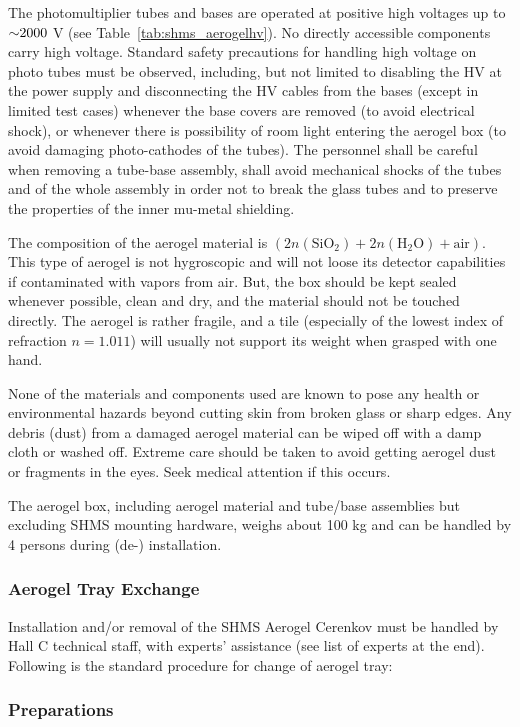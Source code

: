 {The photomultiplier tubes and bases are operated at positive high
voltages up to $\mathord{\sim} 2000$ V (see Table~\ref{tab:shms_aerogelhv}). No directly accessible
components carry high voltage. Standard safety precautions for
handling high voltage on photo tubes must be observed, including, but
not limited to disabling the HV at the power supply and disconnecting
the HV cables from the bases (except in limited test cases) whenever
the base covers are removed (to avoid electrical shock), or whenever
there is possibility of room light entering the aerogel box (to avoid
damaging photo-cathodes of the tubes). The personnel shall be careful
when removing a tube-base assembly, shall avoid mechanical shocks of
the tubes and of the whole assembly in order not to break the glass
tubes and to preserve the properties of the inner mu-metal shielding.

The composition of the aerogel material is
$(2n(\textrm{SiO}_2)+2n(\textrm{H}_2 \textrm{O})+\textrm{air})$. This type of aerogel is not hygroscopic and
will not loose its detector capabilities if contaminated with vapors
from air. But, the box should be kept sealed whenever possible, clean
and dry, and the material should not be touched directly. The aerogel
is rather fragile, and a tile (especially of the lowest index of
refraction $n=1.011$) will usually not support its weight when grasped
with one hand.

None of the materials and components used are known to pose any health
or environmental hazards beyond cutting skin from broken glass or
sharp edges. Any debris (dust) from a damaged aerogel material can be
wiped off with a damp cloth or washed off. Extreme care should be
taken to avoid getting aerogel dust or fragments in the eyes. Seek
medical attention if this occurs.

The aerogel box, including aerogel material and tube/base assemblies
but excluding SHMS mounting hardware, weighs about 100 kg and can be
handled by 4 persons during (de-) installation.

\subsubsection{Aerogel Tray Exchange}
Installation and/or removal of the SHMS Aerogel Cerenkov must be
handled by Hall C technical staff, with experts’ assistance (see
list of experts at the end). Following is the standard procedure for
change of aerogel tray:

\subsubsection*{Preparations}

}
